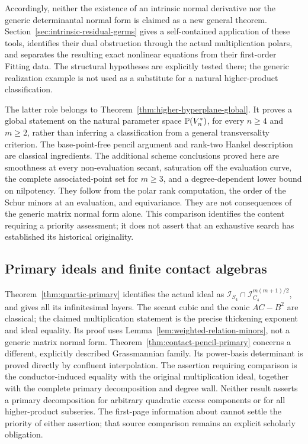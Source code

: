 Accordingly, neither the existence of an intrinsic normal derivative
nor the generic determinantal normal form is claimed as a new general
theorem. Section~\ref{sec:intrinsic-residual-germs} gives a
self-contained application of these tools, identifies their dual
obstruction through the actual multiplication polars, and separates
the resulting exact nonlinear equations from their first-order
Fitting data. The structural hypotheses are explicitly tested there;
the generic realization example is not used as a substitute for a
natural higher-product classification.

The latter role belongs to
Theorem~\ref{thm:higher-hyperplane-global}. It proves a global statement
on the natural parameter space $\mathbb P(V_n^*)$, for every $n\ge4$ and
$m\ge2$, rather than inferring a classification from a general
transversality criterion. The base-point-free pencil argument and
rank-two Hankel description are classical ingredients. The additional
scheme conclusions proved here are smoothness at every non-evaluation
secant, saturation off the evaluation curve, the complete associated-point
set for $m\ge3$, and a degree-dependent lower bound on nilpotency.
They follow from the polar rank computation, the order of the Schur
minors at an evaluation, and equivariance. They are not consequences
of the generic matrix normal form alone. This comparison identifies
the content requiring a priority assessment; it does not assert that
an exhaustive search has established its historical originality.

\subsection{Primary ideals and finite contact algebras}
Theorem~\ref{thm:quartic-primary} identifies the actual ideal as
$\mathcal I_{S_4}\cap\mathcal I_{C_4}^{m(m+1)/2}$, and gives
all its infinitesimal layers. The secant cubic and the conic
$AC-B^2$ are classical; the claimed multiplication statement is
the precise thickening exponent and ideal equality. Its proof
uses Lemma~\ref{lem:weighted-relation-minors}, not a generic
matrix normal form. Theorem~\ref{thm:contact-pencil-primary}
concerns a different, explicitly described Grassmannian family.
Its power-basis determinant is proved directly by confluent
interpolation. The assertion requiring comparison is the
conductor-induced equality with the original multiplication ideal,
together with the complete primary decomposition and degree wall.
Neither result asserts a primary decomposition for arbitrary
quadratic excess components or for all higher-product subseries.
The first-page information about \cite{Ballico93} cannot settle
the priority of either assertion; that source comparison remains
an explicit scholarly obligation.

